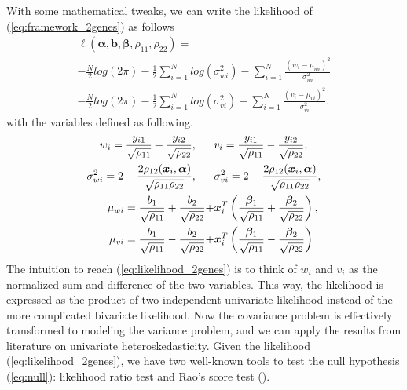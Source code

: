 \documentclass[aap,authoryear, preprint]{imsart}
\numberwithin{equation}{section}
\theoremstyle{plain}
\begin{document}
With some mathematical tweaks, we can write the likelihood of (\ref{eq:framework_2genes}) as follows
\begin{equation}
\begin{multlined}
\ell(\bm{\alpha}, \bm{b}, \bm{\beta}, \rho_{11}, \rho_{22}) = \\
-\frac{N}{2} log(2\pi) - \frac{1}{2} \sum_{i=1}^{N} log (\sigma_{wi}^2) - \sum_{i=1}^{N} \frac{(w_i - \mu_{wi})^2}{\sigma_{wi}^2}\\
-\frac{N}{2} log(2\pi) - \frac{1}{2} \sum_{i=1}^{N} log (\sigma_{vi}^2) - \sum_{i=1}^{N} \frac{(v_i - \mu_{vi})^2}{\sigma_{vi}^2}.
\end{multlined}
    \label{eq:likelihood_2genes}
\end{equation}
with the variables defined as following.
\begin{align*}
w_i = \frac{y_{i1}}{\sqrt{\rho_{11}}} + \frac{y_{i2}}{\sqrt{\rho_{22}}}, 
\hspace{6mm} &
v_i = \frac{y_{i1}}{\sqrt{\rho_{11}}} - \frac{y_{i2}}{\sqrt{\rho_{22}}},\\
\sigma_{wi}^2 = 2 + \frac{2\rho_{12}(\bm{x}_i, \bm{\alpha})}{\sqrt{\rho_{11}\rho_{22}}}, \hspace{6mm}&
\sigma_{vi}^2 = 2 - \frac{2\rho_{12}(\bm{x}_i, \bm{\alpha})}{\sqrt{\rho_{11}\rho_{22}}},\\
\mu_{wi} = \frac{{b}_1}{\sqrt{\rho_{11}}} + \frac{{b}_2}{\sqrt{\rho_{22}}} + &\bm{x}_i^T \left(\frac{\bm{\beta}_1}{\sqrt{\rho_{11}}} + \frac{\bm{\beta}_2}{\sqrt{\rho_{22}}}\right),\\
\mu_{vi} = \frac{{b}_1}{\sqrt{\rho_{11}}} - \frac{{b}_2}{\sqrt{\rho_{22}}} + &\bm{x}_i^T \left(\frac{\bm{\beta}_1}{\sqrt{\rho_{11}}} - \frac{\bm{\beta}_2}{\sqrt{\rho_{22}}}\right)
\end{align*}
The intuition to reach (\ref{eq:likelihood_2genes}) is to think of $w_i$ and $v_i$ as the normalized sum and difference of the two variables. This way, the likelihood is expressed as the product of two independent univariate likelihood instead of the more complicated bivariate likelihood. Now the covariance problem is effectively transformed to modeling the variance problem, and we can apply the results from literature on univariate heteroskedasticity. Given the likelihood (\ref{eq:likelihood_2genes}), we have two well-known tools to test the null hypothesis (\ref{eq:null}): likelihood ratio test and Rao's score test (\cite{breusch1979simple}). \\
\end{document}
